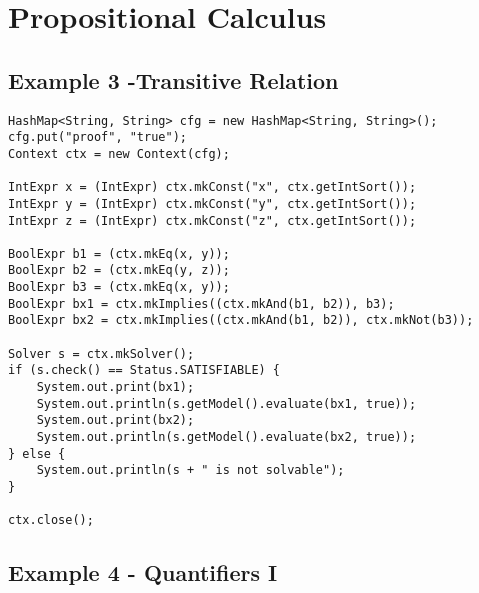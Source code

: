 



\chapter{Propositional Calculus}


\section{Example 3 -Transitive Relation}
\begin{lstlisting}[frame=single]
HashMap<String, String> cfg = new HashMap<String, String>();
cfg.put("proof", "true");
Context ctx = new Context(cfg);

IntExpr x = (IntExpr) ctx.mkConst("x", ctx.getIntSort());
IntExpr y = (IntExpr) ctx.mkConst("y", ctx.getIntSort());
IntExpr z = (IntExpr) ctx.mkConst("z", ctx.getIntSort());
		
BoolExpr b1 = (ctx.mkEq(x, y));
BoolExpr b2 = (ctx.mkEq(y, z));
BoolExpr b3 = (ctx.mkEq(x, y));
BoolExpr bx1 = ctx.mkImplies((ctx.mkAnd(b1, b2)), b3);
BoolExpr bx2 = ctx.mkImplies((ctx.mkAnd(b1, b2)), ctx.mkNot(b3));
		
Solver s = ctx.mkSolver();
if (s.check() == Status.SATISFIABLE) {
	System.out.print(bx1);
	System.out.println(s.getModel().evaluate(bx1, true));
	System.out.print(bx2);
	System.out.println(s.getModel().evaluate(bx2, true));
} else {
	System.out.println(s + " is not solvable");
}

ctx.close();
\end{lstlisting}


\section{Example 4 - Quantifiers I}


